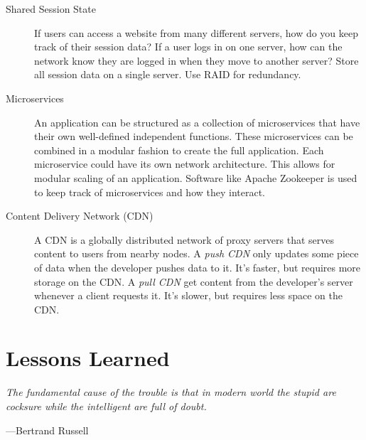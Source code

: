 \begin{description}
	\item[Shared Session State] If users can access a website from many different servers, how do you keep track of their session data? If a user logs in on one server, how can the network know they are logged in when they move to another server? Store all session data on a single server. Use RAID for redundancy.
	
	\item[Microservices] An application can be structured as a collection of microservices that have their own well-defined independent functions. These microservices can be combined in a modular fashion to create the full application. Each microservice could have its own network architecture. This allows for modular scaling of an application. Software like Apache Zookeeper is used to keep track of microservices and how they interact.
	
	\item[Content Delivery Network (CDN)] A CDN is a globally distributed network of proxy servers that serves content to users from nearby nodes. A \textit{push CDN} only updates some piece of data when the developer pushes data to it. It's faster, but requires more storage on the CDN. A \textit{pull CDN} get content from the developer's server whenever a client requests it. It's slower, but requires less space on the CDN.
\end{description}

\newpage


\toclineskip
\section{Lessons Learned}

\vspace{4mm}
\begin{displayquote}
	\textit{The fundamental cause of the trouble is that in modern world the stupid are cocksure while the intelligent are full of doubt.}
	\begin{flushright}
		---Bertrand Russell
	\end{flushright}
\end{displayquote}
\vspace{4mm}


